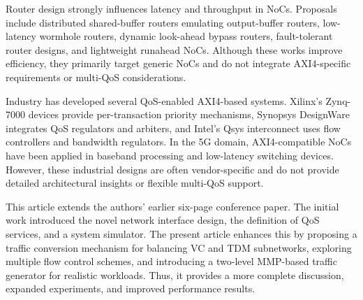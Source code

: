 Router design strongly influences latency and throughput in NoCs. Proposals include distributed shared-buffer routers emulating output-buffer routers, low-latency wormhole routers, dynamic look-ahead bypass routers, fault-tolerant router designs, and lightweight runahead NoCs. Although these works improve efficiency, they primarily target generic NoCs and do not integrate AXI4-specific requirements or multi-QoS considerations. 

Industry has developed several QoS-enabled AXI4-based systems. Xilinx’s Zynq-7000 devices provide per-transaction priority mechanisms, Synopsys DesignWare integrates QoS regulators and arbiters, and Intel’s Qsys interconnect uses flow controllers and bandwidth regulators. In the 5G domain, AXI4-compatible NoCs have been applied in baseband processing and low-latency switching devices. However, these industrial designs are often vendor-specific and do not provide detailed architectural insights or flexible multi-QoS support. 

This article extends the authors’ earlier six-page conference paper. The initial work introduced the novel network interface design, the definition of QoS services, and a system simulator. The present article enhances this by proposing a traffic conversion mechanism for balancing VC and TDM subnetworks, exploring multiple flow control schemes, and introducing a two-level MMP-based traffic generator for realistic workloads. Thus, it provides a more complete discussion, expanded experiments, and improved performance results. 

